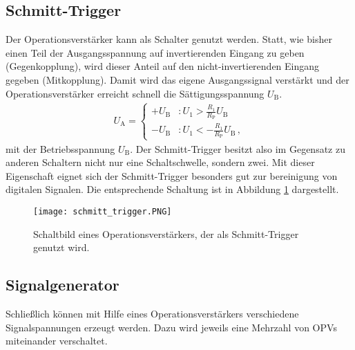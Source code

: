 \documentclass[
  bibliography=totoc,     %
  captions=tableheading,  %
  titlepage=firstiscover, %
]{scrartcl}
\begin{document}
\subsection{Schmitt-Trigger}
\label{subsec:schmitt_trigger}
Der Operationsverstärker kann als Schalter genutzt werden. Statt, wie bisher
einen Teil der Ausgangsspannung auf invertierenden Eingang zu geben (Gegenkopplung),
wird dieser Anteil auf den nicht-invertierenden Eingang gegeben (Mitkopplung).
Damit wird das eigene Ausgangssignal verstärkt und der Operationsverstärker erreicht
schnell die Sättigungsspannung $U_\text{B}$.
\begin{align}
    U_\text{A} =
    \begin{cases}
        +U_\text{B} &: U_1 > \frac{R_1}{R_\text{P}}U_\text{B} \\
        -U_\text{B} &: U_1 < -\frac{R_1}{R_\text{P}}U_\text{B}\,,
    \end{cases}
    \label{eqn:schmitt}
\end{align}
mit der Betriebsspannung $U_\text{B}$. Der Schmitt-Trigger besitzt also im Gegensatz
zu anderen Schaltern nicht nur eine Schaltschwelle, sondern zwei. Mit dieser Eigenschaft eignet sich der Schmitt-Trigger
besonders gut zur bereinigung von digitalen Signalen.
Die entsprechende Schaltung ist in Abbildung \ref{fig:schmitt_trigger}
dargestellt.
\begin{figure}[H]
    \centering
    \texttt{[image: schmitt\_trigger.PNG]}
    \caption{
        Schaltbild eines Operationsverstärkers, der als Schmitt-Trigger
        genutzt wird.
    }
    \label{fig:schmitt_trigger}
\end{figure}
\clearpage
\subsection{Signalgenerator}
\label{subsec:signalgenerator}
Schließlich können mit Hilfe eines Operationsverstärkers verschiedene
Signalspannungen erzeugt werden. Dazu wird jeweils eine Mehrzahl von OPVs
miteinander verschaltet.
\end{document}

